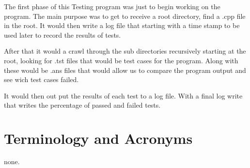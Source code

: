 The first phase of this Testing program was just to begin working on the program.
The main purpose was to get to receive a root directory, find a .cpp file
in the root. It would then write a log file that starting with a time stamp to
be used later to record the results of tests.
	
	After that it would a crawl through the sub directories recursively
starting at the root, looking for .tst files that would be test cases for 
the program. Along with these would be .ans files that would allow us to
compare the program output and see wich test cases failed. 
	
	It would then out put the results of each test to a log file. With a final
log write that writes the percentage of passed and failed tests.

\section{Terminology and Acronyms}
none. 
